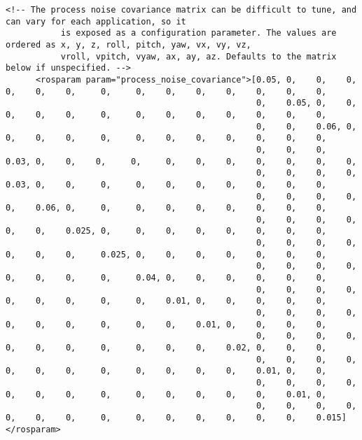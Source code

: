 \begin{lstlisting}[breaklines=true,basicstyle=\tiny]
      <!-- The process noise covariance matrix can be difficult to tune, and can vary for each application, so it
           is exposed as a configuration parameter. The values are ordered as x, y, z, roll, pitch, yaw, vx, vy, vz,
           vroll, vpitch, vyaw, ax, ay, az. Defaults to the matrix below if unspecified. -->
      <rosparam param="process_noise_covariance">[0.05, 0,    0,    0,    0,    0,    0,     0,     0,    0,    0,    0,    0,    0,    0,
                                                  0,    0.05, 0,    0,    0,    0,    0,     0,     0,    0,    0,    0,    0,    0,    0,
                                                  0,    0,    0.06, 0,    0,    0,    0,     0,     0,    0,    0,    0,    0,    0,    0,
                                                  0,    0,    0,    0.03, 0,    0,    0,     0,     0,    0,    0,    0,    0,    0,    0,
                                                  0,    0,    0,    0,    0.03, 0,    0,     0,     0,    0,    0,    0,    0,    0,    0,
                                                  0,    0,    0,    0,    0,    0.06, 0,     0,     0,    0,    0,    0,    0,    0,    0,
                                                  0,    0,    0,    0,    0,    0,    0.025, 0,     0,    0,    0,    0,    0,    0,    0,
                                                  0,    0,    0,    0,    0,    0,    0,     0.025, 0,    0,    0,    0,    0,    0,    0,
                                                  0,    0,    0,    0,    0,    0,    0,     0,     0.04, 0,    0,    0,    0,    0,    0,
                                                  0,    0,    0,    0,    0,    0,    0,     0,     0,    0.01, 0,    0,    0,    0,    0,
                                                  0,    0,    0,    0,    0,    0,    0,     0,     0,    0,    0.01, 0,    0,    0,    0,
                                                  0,    0,    0,    0,    0,    0,    0,     0,     0,    0,    0,    0.02, 0,    0,    0,
                                                  0,    0,    0,    0,    0,    0,    0,     0,     0,    0,    0,    0,    0.01, 0,    0,
                                                  0,    0,    0,    0,    0,    0,    0,     0,     0,    0,    0,    0,    0,    0.01, 0,
                                                  0,    0,    0,    0,    0,    0,    0,     0,     0,    0,    0,    0,    0,    0,    0.015]</rosparam>


\end{lstlisting}
